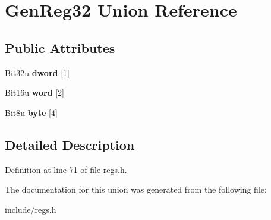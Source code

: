\hypertarget{unionGenReg32}{\section{Gen\-Reg32 Union Reference}
\label{unionGenReg32}
}
\subsection*{Public Attributes}
\begin{DoxyCompactItemize}
\item 
\hypertarget{unionGenReg32_a7f3490b3da7af3a42fd6cd99c0a74df3}{Bit32u {\bfseries dword} \mbox{[}1\mbox{]}}\label{unionGenReg32_a7f3490b3da7af3a42fd6cd99c0a74df3}

\item 
\hypertarget{unionGenReg32_adae8961aecfa03ff7a7013a897fdbd25}{Bit16u {\bfseries word} \mbox{[}2\mbox{]}}\label{unionGenReg32_adae8961aecfa03ff7a7013a897fdbd25}

\item 
\hypertarget{unionGenReg32_a9ea9740d7dbdc7c825d6c88ae4dd8d46}{Bit8u {\bfseries byte} \mbox{[}4\mbox{]}}\label{unionGenReg32_a9ea9740d7dbdc7c825d6c88ae4dd8d46}

\end{DoxyCompactItemize}


\subsection{Detailed Description}


Definition at line 71 of file regs.\-h.



The documentation for this union was generated from the following file\-:\begin{DoxyCompactItemize}
\item 
include/regs.\-h\end{DoxyCompactItemize}
